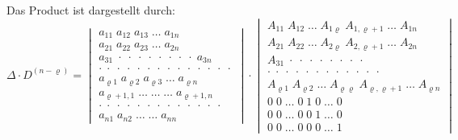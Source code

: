 \documentclass[11pt]{article}
\let\Delta\varDelta
\begin{document}
Das Product ist dargestellt durch:
\[
\Delta\cdot D^{(n-\varrho)}=
\begin{vmatrix}
a_{11}\;a_{12}\;a_{13}\;\ldots\;a_{1n} \\
a_{21}\;a_{22}\;a_{23}\;\ldots\;a_{2n} \\
a_{31}\;\cdot\;\cdot\;\cdot\;\cdot\;\cdot\;\cdot\;\cdot\;\cdot\;a_{3n} \\
\cdot\;\cdot\;\cdot\;\cdot\;\cdot\;\cdot\;\cdot\;\cdot\;\cdot\;\cdot\;\cdot\;\cdot\;\cdot\;\cdot \\
a_{\varrho 1}\;a_{\varrho 2}\;a_{\varrho 3}\;\ldots\;a_{\varrho n} \\
a_{\varrho+1,1}\;\ldots\;\ldots\;\ldots\;a_{\varrho+1,n} \\
\cdot\;\cdot\;\cdot\;\cdot\;\cdot\;\cdot\;\cdot\;\cdot\;\cdot\;\cdot\;\cdot\;\cdot\;\cdot \\
a_{n1}\;a_{n2}\;\ldots\;\ldots\;a_{nn}
\end{vmatrix}
\cdot
\begin{vmatrix}
A_{11}\;A_{12}\;\ldots\;A_{1\varrho}\;A_{1,\varrho+1}\;\ldots\;A_{1n} \\
A_{21}\;A_{22}\;\ldots\;A_{2\varrho}\;A_{2,\varrho+1}\;\ldots\;A_{2n} \\
A_{31}\;\cdot\;\cdot\;\cdot\;\cdot\;\cdot\;\cdot\;\cdot\;\cdot \\
\cdot\;\cdot\;\cdot\;\cdot\;\cdot\;\cdot\;\cdot\;\cdot\;\cdot\;\cdot\;\cdot\;\cdot \\
A_{\varrho 1}\;A_{\varrho 2}\;\ldots\;A_{\varrho\varrho}\;A_{\varrho,\varrho+1}\;\ldots\;A_{\varrho n} \\
0\;0\;\ldots\;0\;1\;0\;\ldots\;0 \\
0\;0\;\ldots\;0\;0\;1\;\ldots\;0 \\
0\;0\;\ldots\;0\;0\;0\;\ldots\;1
\end{vmatrix}
\]
\end{document}
